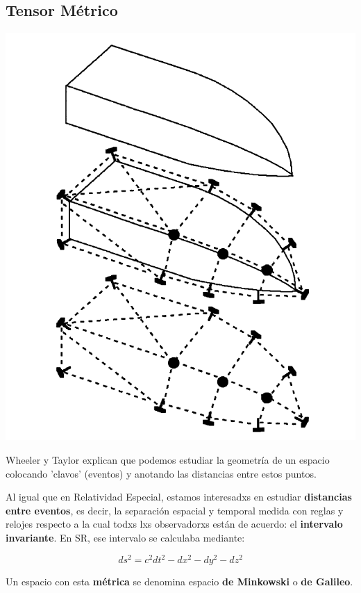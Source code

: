 \subsection*{\textbf{Tensor Métrico}}
\begin{marginfigure}
\captionsetup{type=figure}
    \centering
    \includegraphics[width=1.3\textwidth]{Im/bote.png}
    \caption{Wheeler y Taylor explican que podemos estudiar la geometría de un espacio colocando 'clavos' (eventos) y anotando las distancias entre estos puntos.}
    \label{fig:sen}
\end{marginfigure}

Al igual que en Relatividad Especial, estamos interesadxs en estudiar \textbf{distancias entre eventos}, es decir, la separación espacial y temporal medida con reglas y relojes respecto a la cual todxs lxs observadorxs están de acuerdo: el \textbf{intervalo invariante}. En SR, ese intervalo se calculaba mediante:

\begin{equation}
    ds^2 = c^2 dt^2 -dx^2 -dy^2 - dz^2
\end{equation}

Un espacio con esta \textbf{métrica} se denomina espacio \textbf{de Minkowski} o \textbf{de Galileo}.

